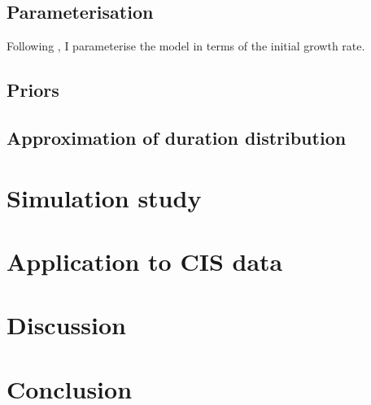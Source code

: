 \documentclass[thesis.tex]{subfiles}
\begin{document}
\subsection{Parameterisation}

Following \textcite{birrellBayesian}, I parameterise the model in terms of the initial growth rate.


\subsection{Priors}

\subsection{Approximation of duration distribution}

\section{Simulation study} \label{SEIR:sec:sim-study}

\section{Application to CIS data} \label{SEIR:sec:application}

\section{Discussion} \label{SEIR:sec:discussion}

\section{Conclusion}
\end{document}
